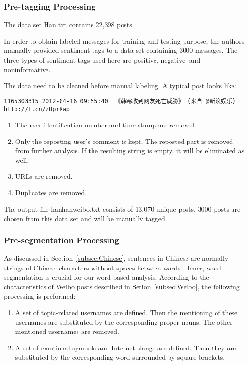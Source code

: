\documentclass[11pt]{article}
\newcommand{\1}[1]{{\mathbf 1}\left\{#1\right\}}        %
\begin{document}
\subsubsection{Pre-tagging Processing}

The data set {\ttfamily Han.txt} contains 22,398 posts.

In order to obtain labeled messages for training and testing purpose, the authors manually provided sentiment tags to a data set containing 3000 messages. The three types of sentiment tags used here are positive, negative, and noninformative.

The data need to be cleaned before manual labeling.
A typical post looks like:
\begin{verbatim}
1165303315 2012-04-16 09:55:40  《韩寒收到网友死亡威胁》 (来自 @新浪娱乐) http://t.cn/zOprKap
\end{verbatim}

\begin{enumerate}
\item The user identification number and time stamp are removed.
\item Only the reposting user's comment is kept. The reposted part is removed from further analysis. If the resulting string is empty, it will be eliminated as well.
\item URLs are removed.
\item Duplicates are removed.
\end{enumerate}

The output file {\ttfamily hanhanweibo.txt} consists of 13,070 unique posts. 3000 posts are chosen from this data set and will be manually tagged.



\subsubsection{Pre-segmentation Processing}

As discussed in Section~\ref{subsec:Chinese}, sentences in Chinese are normally strings of Chinese characters without spaces between words. Hence, word segmentation is crucial for our word-based analysis. According to the characteristics of Weibo posts described in Setion~\ref{subsec:Weibo}, the following processing is preformed:
\begin{enumerate}
\item A set of topic-related usernames are defined.  Then the mentioning of these usernames are substituted by the corresponding proper nouns. The other mentioned usernames are removed.
\item A set of emotional symbols and Internet slangs are defined.  Then they are substituted by the corresponding word surrounded by square brackets.
\end{enumerate}
\end{document}
